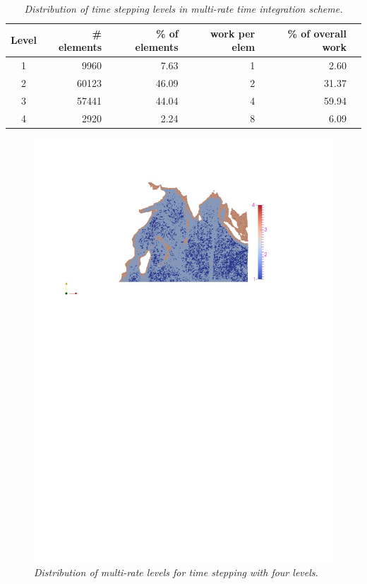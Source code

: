\begin{table}[h!]
\begin{center}
\begin{tabular}{crrrrr}
\hline
Level & \# elements & \% of elements & work per elem & \% of overall work\\ \hline
1 &  9960 &  7.63 & 1 & 2.60\\
2 & 60123 &  46.09 & 2 & 31.37\\
3 & 57441 & 44.04 & 4 & 59.94\\
4 &  2920 &  2.24 & 8 & 6.09\\\hline
\end{tabular}
\caption{\emph{Distribution of time stepping levels in multi-rate time integration
scheme.}}
\label{tab:pasidgLevels}
\end{center}
\end{table}
\begin{figure}[h!]
\begin{center}
\includegraphics[trim=6cm 19.65cm 4.5cm 3.1cm,clip=true,width=0.5\linewidth]{./figures/IndianOceanLevels.pdf}
\caption{\emph{Distribution of  multi-rate levels for time stepping with
four levels.}}
\label{fig:indian_ocean_levels}
\end{center}
\end{figure}

